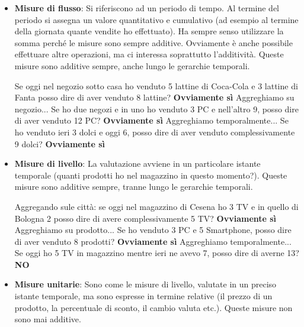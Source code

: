 \begin{itemize}
	\item \textbf{Misure di flusso}: Si riferiscono ad un periodo di tempo. Al termine del periodo si assegna un valore quantitativo e cumulativo (ad esempio al termine della giornata quante vendite ho effettuato). Ha sempre senso utilizzare la somma perché le misure sono sempre additive. Ovviamente è anche possibile effettuare altre operazioni, ma ci interessa soprattutto l'additività.\newline
	Queste misure sono additive sempre, anche lungo le gerarchie temporali.
	\begin{info}[Esempio:]
		\newline Se oggi nel negozio sotto casa ho venduto 5 lattine di Coca-Cola e 3 lattine di Fanta posso dire di aver venduto 8 lattine? \textbf{Ovviamente sì}\newline
		Aggreghiamo su negozio... Se ho due negozi e in uno ho venduto 3 PC e nell'altro 9, posso dire di aver venduto 12 PC? \textbf{Ovviamente sì}\newline
		Aggreghiamo temporalmente... Se ho venduto ieri 3 dolci e oggi 6, posso dire di aver venduto complessivamente 9 dolci? \textbf{Ovviamente sì}
	\end{info}
	\item \textbf{Misure di livello}: La valutazione avviene in un particolare istante temporale (quanti prodotti ho nel magazzino in questo momento?). Queste misure sono additive sempre, tranne lungo le gerarchie temporali.
	\begin{info}[Esempio:]
		\newline Aggregando sule città: se oggi nel magazzino di Cesena ho 3 TV e in quello di Bologna 2 posso dire di avere complessivamente 5 TV? \textbf{Ovviamente sì}\newline
		Aggreghiamo su prodotto... Se ho venduto 3 PC e 5 Smartphone, posso dire di aver venduto 8 prodotti? \textbf{Ovviamente sì}\newline
		Aggreghiamo temporalmente... Se oggi ho 5 TV in magazzino mentre ieri ne avevo 7, posso dire di averne 13? \textbf{NO}\newline
	\end{info}
	\item \textbf{Misure unitarie}: Sono come le misure di livello, valutate in un preciso istante temporale, ma sono espresse in termine relative (il prezzo di un prodotto, la percentuale di sconto, il cambio valuta etc.). Queste misure non sono mai additive.
	\begin{info}[Esempio:]

\end{info}
\end{itemize}
